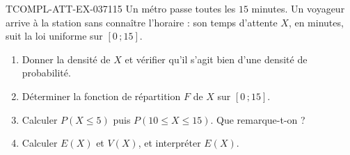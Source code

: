 \begin{exercice}{TCOMPL-ATT-EX-037}{1}{15}
Un métro passe toutes les $15$ minutes. Un voyageur arrive à la station sans connaître l'horaire : son temps d'attente $X$, en minutes, suit la loi uniforme sur $[0\,;15]$.
\begin{enumerate}
  \item Donner la densité de $X$ et vérifier qu'il s'agit bien d'une densité de probabilité.
  \item Déterminer la fonction de répartition $F$ de $X$ sur $[0\,;15]$.
  \item Calculer $P(X \leq 5)$ puis $P(10 \leq X \leq 15)$. Que remarque-t-on ?
  \item Calculer $E(X)$ et $V(X)$, et interpréter $E(X)$.
\end{enumerate}
\end{exercice}
